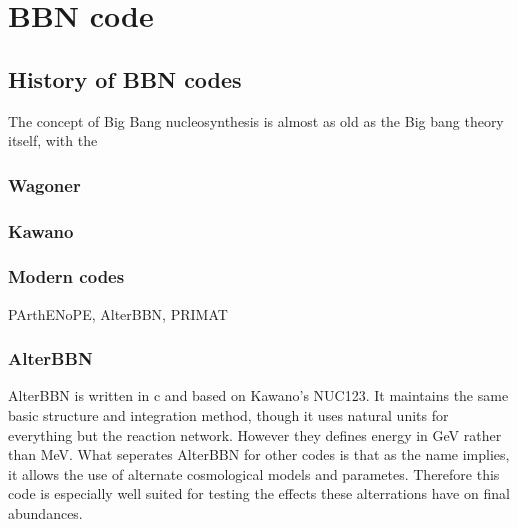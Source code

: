 
\chapter{BBN code}
\label{chap:BBNcode}

\section{History of BBN codes}
\label{sec:BBN_history}

The concept of Big Bang nucleosynthesis is almost as old as the Big bang theory itself, with the \cite*{Gamov48}

\subsection{Wagoner}
\label{sec:Wagoner}

\subsection{Kawano}
\label{sec:Kawano}

\subsection{Modern codes}
\label{sec:Modern_codes}
PArthENoPE, AlterBBN, PRIMAT


\subsection{AlterBBN}
\label{sec:AlterBBN}

AlterBBN is written in c and based on Kawano's NUC123. It maintains the same basic structure and integration method, though it uses natural units for everything but the reaction network. However they defines energy in GeV rather than MeV. What seperates AlterBBN for other codes is that as the name implies, it allows the use of alternate cosmological models and parametes. Therefore this code is especially well suited for testing the effects these alterrations have on final abundances.